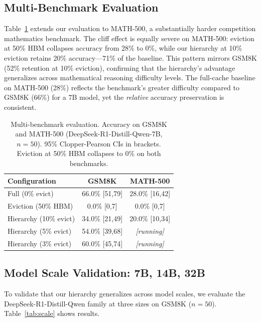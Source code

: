 \documentclass{article}
\begin{document}
\subsection{Multi-Benchmark Evaluation}

Table~\ref{tab:multi} extends our evaluation to MATH-500, a substantially harder competition mathematics benchmark.
The cliff effect is equally severe on MATH-500: eviction at 50\% HBM collapses accuracy from 28\% to 0\%, while our hierarchy at 10\% eviction retains 20\% accuracy---71\% of the baseline.
This pattern mirrors GSM8K (52\% retention at 10\% eviction), confirming that the hierarchy's advantage generalizes across mathematical reasoning difficulty levels.
The full-cache baseline on MATH-500 (28\%) reflects the benchmark's greater difficulty compared to GSM8K (66\%) for a 7B model, yet the \emph{relative} accuracy preservation is consistent.

\begin{table}[t]
\centering
\caption{Multi-benchmark evaluation. Accuracy on GSM8K and MATH-500 (DeepSeek-R1-Distill-Qwen-7B, $n=50$). 95\% Clopper-Pearson CIs in brackets. Eviction at 50\% HBM collapses to 0\% on both benchmarks.}
\label{tab:multi}
\vskip 0.1in
\begin{tabular}{lcc}
\toprule
\textbf{Configuration} & \textbf{GSM8K} & \textbf{MATH-500} \\
\midrule
Full (0\% evict) & 66.0\% {\scriptsize[51,79]} & 28.0\% {\scriptsize[16,42]} \\
Eviction (50\% HBM) & 0.0\% {\scriptsize[0,7]} & 0.0\% {\scriptsize[0,7]} \\
Hierarchy (10\% evict) & 34.0\% {\scriptsize[21,49]} & 20.0\% {\scriptsize[10,34]} \\
Hierarchy (5\% evict) & 54.0\% {\scriptsize[39,68]} & \textit{[running]} \\
Hierarchy (3\% evict) & 60.0\% {\scriptsize[45,74]} & \textit{[running]} \\
\bottomrule
\end{tabular}
\end{table}

\subsection{Model Scale Validation: 7B, 14B, 32B}
\label{sec:scale}

To validate that our hierarchy generalizes across model scales, we evaluate the DeepSeek-R1-Distill-Qwen family at three sizes on GSM8K ($n{=}50$).
Table~\ref{tab:scale} shows results.
\end{document}
